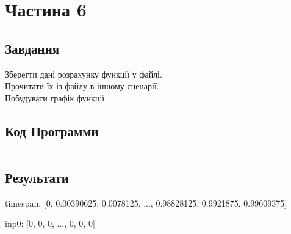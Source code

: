 \section{Частина 6}
\label{sec:task6}

\subsection{Завдання}
\label{subsec:task6_task}

Зберегти дані розрахунку функції у файлі. \\
Прочитати їх із файлу в іншому сценарії. \\
Побудувати графік функції.

\subsection{Код Программи}
\label{subsec:task6_code}
\inputminted{python}{../src/task6.py}

\subsection{Результати}
\label{subsec:task6_results}

timespan:
[0, 0.00390625, 0.0078125, ..., 0.98828125, 0.9921875, 0.99609375]

inp0:
[0, 0, 0, ..., 0, 0, 0]

